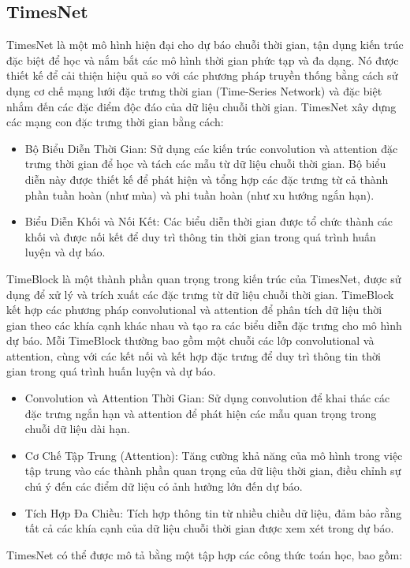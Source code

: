\documentclass[conference]{IEEEtran}
\begin{document}
\subsection{TimesNet}
TimesNet là một mô hình hiện đại cho dự báo chuỗi thời gian, tận dụng kiến trúc đặc biệt để học và nắm bắt các mô hình thời gian phức tạp và đa dạng. Nó được thiết kế để cải thiện hiệu quả so với các phương pháp truyền thống bằng cách sử dụng cơ chế mạng lưới đặc trưng thời gian (Time-Series Network) và đặc biệt nhắm đến các đặc điểm độc đáo của dữ liệu chuỗi thời gian. TimesNet xây dựng các mạng con đặc trưng thời gian bằng cách:
\begin{itemize}
	\item Bộ Biểu Diễn Thời Gian: Sử dụng các kiến trúc convolution và attention đặc trưng thời gian để học và tách các mẫu từ dữ liệu chuỗi thời gian. Bộ biểu diễn này được thiết kế để phát hiện và tổng hợp các đặc trưng từ cả thành phần tuần hoàn (như mùa) và phi tuần hoàn (như xu hướng ngắn hạn).
	\item Biểu Diễn Khối và Nối Kết: Các biểu diễn thời gian được tổ chức thành các khối và được nối kết để duy trì thông tin thời gian trong quá trình huấn luyện và dự báo.
\end{itemize}
TimeBlock là một thành phần quan trọng trong kiến trúc của TimesNet, được sử dụng để xử lý và trích xuất các đặc trưng từ dữ liệu chuỗi thời gian. TimeBlock kết hợp các phương pháp convolutional và attention để phân tích dữ liệu thời gian theo các khía cạnh khác nhau và tạo ra các biểu diễn đặc trưng cho mô hình dự báo.
Mỗi TimeBlock thường bao gồm một chuỗi các lớp convolutional và attention, cùng với các kết nối và kết hợp đặc trưng để duy trì thông tin thời gian trong quá trình huấn luyện và dự báo. 
\begin{itemize}
	\item Convolution và Attention Thời Gian: Sử dụng convolution để khai thác các đặc trưng ngắn hạn và attention để phát hiện các mẫu quan trọng trong chuỗi dữ liệu dài hạn.
	\item Cơ Chế Tập Trung (Attention): Tăng cường khả năng của mô hình trong việc tập trung vào các thành phần quan trọng của dữ liệu thời gian, điều chỉnh sự chú ý đến các điểm dữ liệu có ảnh hưởng lớn đến dự báo.
	\item Tích Hợp Đa Chiều: Tích hợp thông tin từ nhiều chiều dữ liệu, đảm bảo rằng tất cả các khía cạnh của dữ liệu chuỗi thời gian được xem xét trong dự báo.
\end{itemize}
TimesNet có thể được mô tả bằng một tập hợp các công thức toán học, bao gồm:
\end{document}

